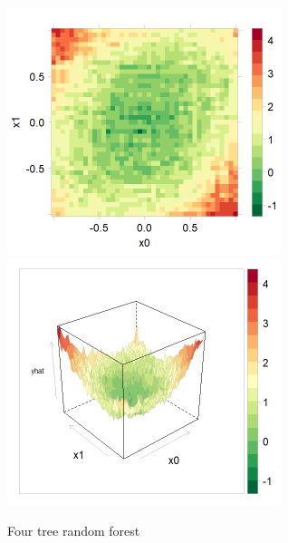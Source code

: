 \documentclass[10pt,openany]{article}
\numberwithin{definition}{section}
\numberwithin{example}{section}
\numberwithin{equation}{section}
\numberwithin{figure}{section}
\begin{document}
\begin{figure}
\noindent \begin{centering}
\includegraphics[width=80mm]{fig/rf-4-tree-levelplot}~
\includegraphics[width=80mm]{fig/rf-4-tree-wireframe}
\par\end{centering}
\protect\caption{\label{fig:four-tree-random}Four tree random forest}
\end{figure}
\end{document}
